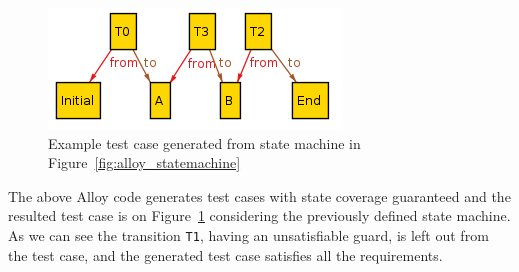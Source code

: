 \begin{figure}[htp]
\centering
\includegraphics[scale=0.5]{figures/alloy_statecoverage}
\caption{Example test case generated from state machine in Figure~\ref{fig:alloy_statemachine}}
\label{fig:alloy_statecoverage}
\end{figure}

The above Alloy code generates test cases with state coverage guaranteed and the resulted test case is on Figure~\ref{fig:alloy_statecoverage} considering the previously defined state machine. As we can see the transition \texttt{T1}, having an unsatisfiable guard, is left out from the test case, and the generated test case satisfies all the requirements.

